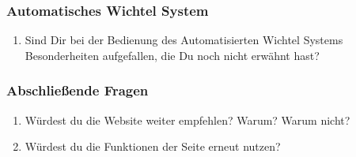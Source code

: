 \subsubsection*{Automatisches Wichtel System}
\begin{enumerate}
\item Sind Dir bei der Bedienung des Automatisierten Wichtel Systems Besonderheiten aufgefallen, die Du noch nicht erwähnt hast?
\end{enumerate}

\subsubsection*{Abschließende Fragen}
\begin{enumerate}
\item Würdest du die Website weiter empfehlen? Warum? Warum nicht?
\item Würdest du die Funktionen der Seite erneut nutzen?
\end{enumerate}
